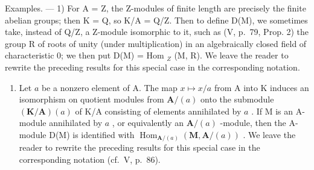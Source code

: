Examples. --- 1) For A = Z, the Z-modules of finite length are precisely the finite abelian groups; then K = Q, so K/A = Q/Z. Then to define D(M), we sometimes take, instead of Q/Z, a Z-module isomorphic to it, such as (V, p.~79, Prop. 2) the group R of roots of unity (under multiplication) in an algebraically closed field of characteristic 0; we then put D(M) = Hom \(_{Z}\) (M, R). We leave the reader to rewrite the preceding results for this special case in the corresponding notation.

\begin{enumerate}
\def\labelenumi{\arabic{enumi})}
\setcounter{enumi}{1}
\tightlist
\item
  Let \(a\) be a nonzero element of A. The map \(x \mapsto x/a\) from A into K induces an isomorphism on quotient modules from \(\mathbf{A}/(a)\) onto the submodule \((\mathbf{K}/\mathbf{A})(a)\) of K/A consisting of elements annihilated by \(a\) . If M is an A-module annihilated by \(a\) , or equivalently an \(\mathbf{A}/(a)\) -module, then the A-module D(M) is identified with \(\operatorname{Hom}_{\mathbf{A}/(a)}(\mathbf{M}, \mathbf{A}/(a))\) . We leave the reader to rewrite the preceding results for this special case in the corresponding notation (cf.~V, p.~86).
\end{enumerate}

